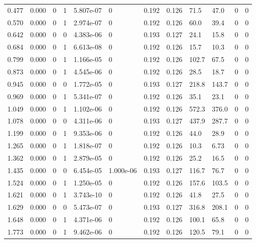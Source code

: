 \documentclass[preview]{standalone}
\begin{document}
{{\begin{tabular}{L{1.2cm}C{1.2cm} C{0.3cm}C{0.5cm} C{1.4cm}C{1.4cm} C{1.4cm}C{1.4cm} C{1.6cm}C{1.6cm} C{1.6cm}C{1.6cm}}
  0.477  &  0.000  & 0     &  1 &  5.807e-07  & 0  &  0.192&   0.126& 71.5 & 47.0   &  0 & 0  \\ 
  0.570  &  0.000  & 0     &  1 &  2.974e-07  & 0  &  0.192&   0.126& 60.0 & 39.4   &  0 & 0  \\ 
  0.642  &  0.000  & 0     &  0 &  4.383e-06  & 0  &  0.193&   0.127& 24.1 & 15.8   &  0 & 0  \\ 
  0.684  &  0.000  & 0     &  1 &  6.613e-08  & 0  &  0.192&   0.126& 15.7 & 10.3   &  0 & 0  \\ 
  0.799  &  0.000  & 0     &  1 &  1.166e-05  & 0  &  0.192&   0.126& 102.7 & 67.5   &  0 & 0  \\ 
  0.873  &  0.000  & 0     &  1 &  4.545e-06  & 0  &  0.192&   0.126& 28.5 & 18.7   &  0 & 0  \\ 
  0.945  &  0.000  & 0     &  0 &  1.772e-05  & 0  &  0.193&   0.127& 218.8 & 143.7   &  0 & 0  \\ 
  0.969  &  0.000  & 0     &  1 &  5.341e-07  & 0  &  0.192&   0.126& 35.1 & 23.1   &  0 & 0  \\ 
  1.049  &  0.000  & 0     &  1 &  1.102e-06  & 0  &  0.192&   0.126& 572.3 & 376.0   &  0 & 0  \\ 
  1.078  &  0.000  & 0     &  0 &  4.311e-06  & 0  &  0.193&   0.127& 437.9 & 287.7   &  0 & 0  \\ 
  1.199  &  0.000  & 0     &  1 &  9.353e-06  & 0  &  0.192&   0.126& 44.0 & 28.9   &  0 & 0  \\ 
  1.265  &  0.000  & 0     &  1 &  1.818e-07  & 0  &  0.192&   0.126& 10.3 & 6.73   &  0 & 0  \\ 
  1.362  &  0.000  & 0     &  1 &  2.879e-05  & 0  &  0.192&   0.126& 25.2 & 16.5   &  0 & 0  \\ 
  1.435  &  0.000  & 0     &  0 &  6.454e-05  & 1.000e-06  &  0.193&   0.127& 116.7 & 76.7   &  0 & 0  \\ 
  1.524  &  0.000  & 0     &  1 &  1.250e-05  & 0  &  0.192&   0.126& 157.6 & 103.5   &  0 & 0  \\ 
  1.621  &  0.000  & 0     &  1 &  3.743e-10  & 0  &  0.192&   0.126& 41.8 & 27.5   &  0 & 0  \\ 
  1.629  &  0.000  & 0     &  0 &  5.473e-07  & 0  &  0.193&   0.127& 316.8 & 208.1   &  0 & 0  \\ 
  1.648  &  0.000  & 0     &  1 &  4.371e-06  & 0  &  0.192&   0.126& 100.1 & 65.8   &  0 & 0  \\ 
  1.773  &  0.000  & 0     &  1 &  9.462e-06  & 0  &  0.192&   0.126& 120.5 & 79.1   &  0 & 0  \\ 

\end{tabular}}}
\end{document}
